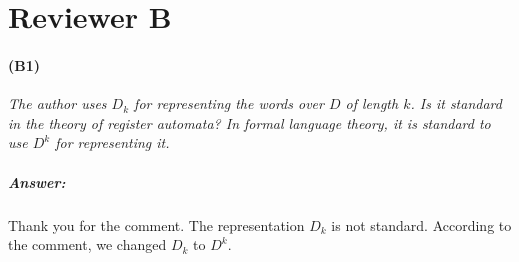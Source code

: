 \documentclass{article}
\begin{document}
\newpage
\section*{Reviewer B}

\paragraph{(B1)}
\textit{
 The author uses $D_k$ for representing the words over $D$ of length $k$.
Is it standard in the theory of register automata? In formal language theory,
it is standard to use $D^k$ for representing it.
}
\subparagraph{Answer:}
Thank you for the comment.
The representation $D_k$ is not standard.
According to the comment, we changed $D_k$ to $D^k$.





\end{document}
